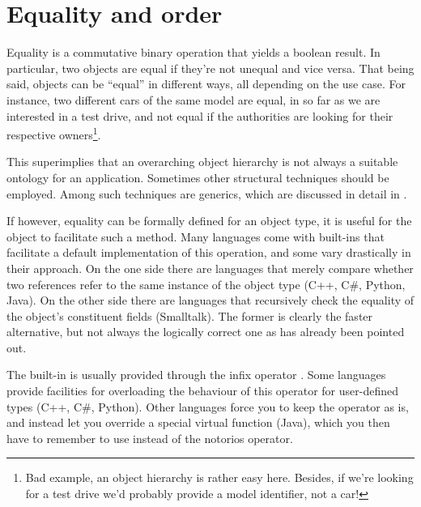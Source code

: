 \section{Equality and order}

Equality is a commutative binary operation that yields a boolean result. In
particular, two objects are equal if they're not unequal and vice versa. That
being said, objects can be ``equal'' in different ways, all depending on the
use case. For instance, two different cars of the same model are equal, in so
far as we are interested in a test drive, and not equal if the authorities are
looking for their respective owners\footnote{Bad example, an object hierarchy
is rather easy here. Besides, if we're looking for a test drive we'd probably
provide a model identifier, not a car!}.

This superimplies that an overarching object hierarchy is not always a suitable
ontology for an application. Sometimes other structural techniques should be
employed. Among such techniques are generics, which are discussed in detail in
.

If however, equality can be formally defined for an object type, it is useful
for the object to facilitate such a method. Many languages come with built-ins
that facilitate a default implementation of this operation, and some vary
drastically in their approach. On the one side there are languages that merely
compare whether two references refer to the same instance of the object type
(C++, C\#, Python, Java). On the other side there are languages that
recursively check the equality of the object's constituent fields (Smalltalk).
The former is clearly the faster alternative, but not always the logically
correct one as has already been pointed out.

The built-in is usually provided through the infix operator \code{==}. Some
languages provide facilities for overloading the behaviour of this operator for
user-defined types (C++, C\#, Python). Other languages force you to keep the
operator as is, and instead let you override a special virtual function (Java),
which you then have to remember to use instead of the notorios \code{==}
operator.


